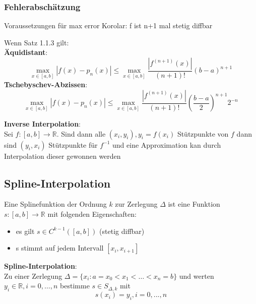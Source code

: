 \documentclass[
	ngerman,
	accentcolor=9c,%
	type=intern,
	marginpar=false
	]{tudapub}
\begin{document}
       \subsubsection{Fehlerabschätzung}
       \setcounter{satz}{2}
       \begin{satz}
            Voraussetzungen für max error Korolar: f ist n+1 mal stetig diffbar
       \end{satz}
       \begin{korolar} 
            
            Wenn Satz 1.1.3 gilt:\\
            \textbf{Äquidistant}:
            \begin{equation*}
                \max_{x \in [a,b]} |f(x) - p_n(x)| \leq \max_{x \in [a,b]} \dfrac{|f^{(n+1)}(x)|}{(n+1)!}(b-a)^{n+1}
            \end{equation*}
            \textbf{Tschebyschev-Abzissen}:
            \begin{equation*}
                \max_{x \in [a,b]} |f(x) - p_n(x)| \leq \max_{x \in [a,b]} \dfrac{|f^{(n+1)}(x)|}{(n+1)!}\left(\dfrac{b-a}{2}\right)^{n+1}2^{-n}
            \end{equation*}
       \end{korolar}
       \textbf{Inverse Interpolation}:\\
       Sei $f:[a,b] \rightarrow \mathbb{R}$.
       Sind dann alle $(x_i,y_i), y_i = f(x_i)$ Stützpunkte von $f$
       dann sind $(y_i, x_i)$ Stützpunkte für $f^{-1}$ und eine Approximation kan durch Interpolation dieser
       gewonnen werden
       \newpage
       \subsection{Spline-Interpolation}
            \begin{definition}
                Eine Splinefunktion der Ordnung $k$ zur Zerlegung $\Delta$ ist eine Funktion $s:[a,b]\rightarrow \mathbb{R}$ mit folgenden Eigenschaften:
                \begin{itemize}
                    \item es gilt $s \in C^{k-1}([a,b])$ (stetig diffbar)
                    \item s stimmt auf jedem Intervall $[x_i,x_{i+1}]$
                \end{itemize}
                \textbf{Spline-Interpolation}: \\
                Zu einer Zerlegung $\Delta = \{x_i:a = x_0 < x_1 < \dots < x_n = b\}$ und werten $y_i \in \mathbb{R}, i = 0, \dots, n$
                bestimme $s \in S_{\Delta,k}$ mit
                \begin{equation*}
                    s(x_i) = y_i, i=0,...,n
                \end{equation*}
            \end{definition}
\end{document}
